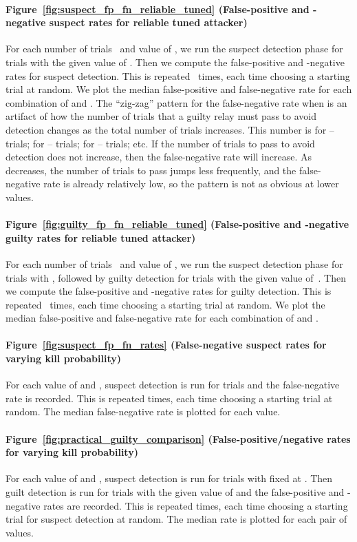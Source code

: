 \documentclass[]{lmcs}
\begin{document}
\paragraph*{Figure~\ref{fig:suspect_fp_fn_reliable_tuned} (False-positive
and -negative suspect rates for reliable tuned attacker)}
For each number of trials~ and value of , 
we run the suspect detection phase for 
trials with the given value of .
Then we compute the false-positive and \mbox{-negative}
rates for suspect detection.  This is repeated~ times, each time choosing
a starting trial at random.  We plot the median false-positive and 
false-negative rate for each combination of  and .
The ``zig-zag'' pattern for the false-negative rate
when  is an artifact of how
the number of trials that a guilty relay must pass to avoid
detection changes as the total number of trials increases.  This number
is  for -- trials;  for -- trials;  for
-- trials; etc.  If the number of trials to pass to avoid 
detection does not increase, then the false-negative rate will increase.
As  decreases, the number of trials to pass jumps less frequently,
and the false-negative rate is already relatively low, so the pattern is
not as obvious at lower values.

\paragraph*{Figure~\ref{fig:guilty_fp_fn_reliable_tuned} (False-positive
and -negative guilty rates for reliable tuned attacker)}
For each number of trials~ and value of , 
we run the suspect detection phase for 
trials with , followed by guilty detection for  trials with the
given value of~.  Then we compute the false-positive and -negative
rates for guilty detection.  This is repeated~ times, each time choosing
a starting trial at random.  We plot the median false-positive and 
false-negative rate for each combination of  and .

\paragraph*{Figure~\ref{fig:suspect_fp_fn_rates} (False-negative suspect
rates for varying kill probability)}
For each value of  and , suspect detection is run for 
trials and the false-negative rate is recorded.  This is repeated  times,
each time choosing a starting trial at random.  The median false-negative
rate is plotted for each value.

\paragraph*{Figure~\ref{fig:practical_guilty_comparison} 
(False-positive/negative rates for varying kill probability)}
For each value of  and , suspect detection is run for 
trials with  fixed at .  Then guilt detection is run for 
trials with the given value of  and the false-positive and -negative
rates are recorded.  This is repeated  times, each time choosing a
starting trial for suspect detection at random.  The median rate is plotted
for each pair of values.
\end{document}

